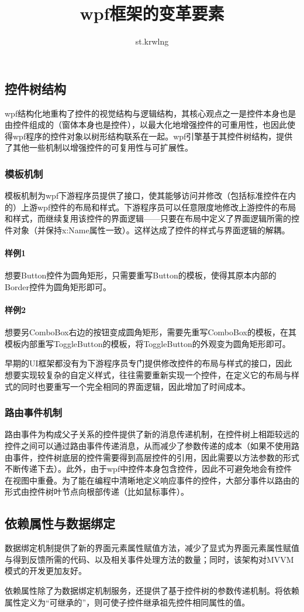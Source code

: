 \documentclass[UTF8]{ctexart}
\title{wpf框架的变革要素}
\author{st.krwlng}
\begin{document}
	\maketitle
	\tableofcontents
	\subsection{控件树结构}
	wpf结构化地重构了控件的视觉结构与逻辑结构，其核心观点之一是控件本身也是由控件组成的（窗体本身也是控件），以最大化地增强控件的可重用性，也因此使得wpf程序的控件对象以树形结构联系在一起。wpf引擎基于其控件树结构，提供了其他一些机制以增强控件的可复用性与可扩展性。
		\subsubsection{模板机制}
		模板机制为wpf下游程序员提供了接口，使其能够访问并修改（包括标准控件在内的）上游wpf控件的布局和样式。下游程序员可以任意限度地修改上游控件的布局和样式，而继续复用该控件的界面逻辑——只要在布局中定义了界面逻辑所需的控件对象（并保持x:Name属性一致）。这样达成了控件的样式与界面逻辑的解耦。
		\paragraph{样例1} 想要Button控件为圆角矩形，只需要重写Button的模板，使得其原本内部的Border控件为圆角矩形即可。
		\paragraph{样例2} 想要另ComboBox右边的按钮变成圆角矩形，需要先重写ComboBox的模板，在其模板内部重写ToggleButton的模板，将ToggleButton的外观变为圆角矩形即可。

		早期的UI框架都没有为下游程序员专门提供修改控件的布局与样式的接口，因此想要实现较复杂的自定义样式，往往需要重新实现一个控件，在定义它的布局与样式的同时也要重写一个完全相同的界面逻辑，因此增加了时间成本。
		\subsubsection{路由事件机制}
		路由事件为构成父子关系的控件提供了新的消息传递机制，在控件树上相距较远的控件之间可以通过路由事件传递消息，从而减少了参数传递的成本（如果不使用路由事件，控件树底层的控件需要得到高层控件的引用，因此需要以方法参数的形式不断传递下去）。此外，由于wpf中控件本身包含控件，因此不可避免地会有控件在视图中重叠。为了能在编程中清晰地定义响应事件的控件，大部分事件以路由的形式由控件树叶节点向根部传递（比如鼠标事件）。
	\subsection{依赖属性与数据绑定}
	数据绑定机制提供了新的界面元素属性赋值方法，减少了显式为界面元素属性赋值与得到反馈所需的代码、以及相关事件处理方法的数量；同时，该架构对MVVM模式的开发更加友好。

	依赖属性除了为数据绑定机制服务，还提供了基于控件树的参数传递机制。将依赖属性定义为“可继承的”，则可使子控件继承祖先控件相同属性的值。
\end{document}
